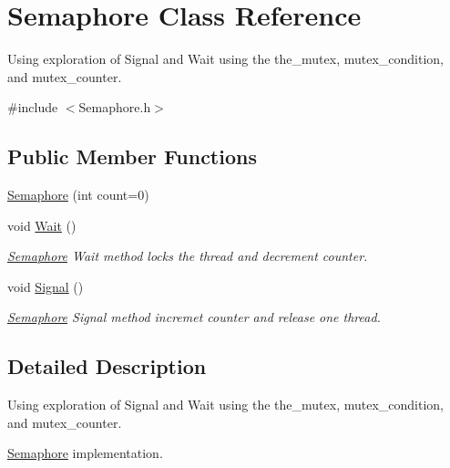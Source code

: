 \hypertarget{classSemaphore}{}\section{Semaphore Class Reference}
\label{classSemaphore}


Using exploration of Signal and Wait using the  the\+\_\+mutex, mutex\+\_\+condition, and mutex\+\_\+counter.  




{\ttfamily \#include $<$Semaphore.\+h$>$}

\subsection*{Public Member Functions}
\begin{DoxyCompactItemize}
\item 
\hyperlink{classSemaphore_aca1661adbce12634d2fa9d7e0c09d121}{Semaphore} (int count=0)
\item 
void \hyperlink{classSemaphore_a72aabebf026e3a8b1f3e4d0fa8ee1eda}{Wait} ()\hypertarget{classSemaphore_a72aabebf026e3a8b1f3e4d0fa8ee1eda}{}\label{classSemaphore_a72aabebf026e3a8b1f3e4d0fa8ee1eda}

\begin{DoxyCompactList}\small\item\em \hyperlink{classSemaphore}{Semaphore} Wait method locks the thread and decrement counter. \end{DoxyCompactList}\item 
void \hyperlink{classSemaphore_a86f92f738b4486439b296d8e235895f2}{Signal} ()\hypertarget{classSemaphore_a86f92f738b4486439b296d8e235895f2}{}\label{classSemaphore_a86f92f738b4486439b296d8e235895f2}

\begin{DoxyCompactList}\small\item\em \hyperlink{classSemaphore}{Semaphore} Signal method incremet counter and release one thread. \end{DoxyCompactList}\end{DoxyCompactItemize}


\subsection{Detailed Description}
Using exploration of Signal and Wait using the  the\+\_\+mutex, mutex\+\_\+condition, and mutex\+\_\+counter. 

\hyperlink{classSemaphore}{Semaphore} implementation.

